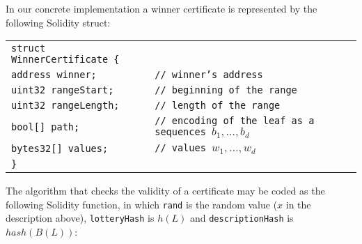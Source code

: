 \documentclass[a4paper]{article}
\begin{document}
    In our concrete implementation a winner certificate is represented by the following Solidity struct:

    \begin{center}
        \begin{tabular}{ll}
            \texttt{struct WinnerCertificate \{} &  \\
		    \qquad \texttt{address winner;} &  \texttt{// winner's address}\\
		    \qquad \texttt{uint32 rangeStart;} & \texttt{// beginning of the range}\\
		    \qquad \texttt{uint32 rangeLength;} & \texttt{// length of the range}\\
		    \qquad \texttt{bool[] path;} & \texttt{// encoding of the leaf as a sequences $b_1, \ldots, b_d$}\\
		    \qquad \texttt{bytes32[] values;} & \texttt{// values $w_1, \ldots, w_d$}\\
    		\texttt{\}}
        \end{tabular}
    \end{center}

    The algorithm that checks the validity of a certificate may be coded as the following Solidity function,
    in which \texttt{rand} is the random value ($x$ in the description above), \texttt{lotteryHash} is $h(L)$
    and \texttt{descriptionHash} is $hash(B(L))$:
\end{document}
